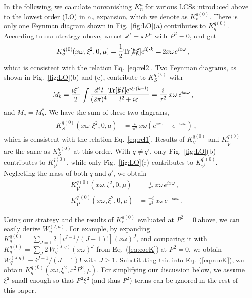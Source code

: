 \documentclass[twocolumn,aps,prl,superscriptaddress,nofootinbib,showpacs]{revtex4-1}
\begin{document}
In the following, we calculate nonvanishing $K_{{n}}^a$ for various LCSs introduced above to the lowest order (LO) in $\alpha_s$ expansion, which we denote as $K_{{n}}^{a(0)}$.
There is only one Feynman diagram shown in Fig.~\ref{fig:LO}(a) contributes to $K^{q(0)}_{q}$. According to our strategy above, we set $k^\mu=x P^\mu$ with $P^2=0$, and get
\begin{align}\label{eq:Kq0}
\begin{split}
K^{q(0)}_{q}(x \omega,\xi^2,0,\mu)&=\frac{1}{2} \text{Tr}[\slashed{k} \slashed{\xi}] e^{i\xi\cdot k}=2 x \omega  e^{i x \omega}\,,
\end{split}
\end{align}
which is consistent with the relation Eq.~\eqref{eq:rel2}. Two Feynman diagrams, as shown in Fig.~\ref{fig:LO}(b) and (c), contribute to $K^{q(0)}_{S}$ with
\begin{align}\label{eq:Mb}
M_b&=\frac{i\xi^4}{2}\int \frac{d^4 l}{(2\pi)^4}\frac{\text{Tr}[\slashed{k} \slashed{l}] e^{i\xi\cdot(k-l)}}{l^2+i\varepsilon}
=\frac{i}{\pi^2}\, x \omega\,  e^{i x \omega}\,,
\end{align}
and $M_c=M_b^*$.  We have the sum of these two diagrams,
\begin{align}\label{eq:Kqq0}
\begin{split}
K^{q(0)}_{S}(x \omega,\xi^2,0,\mu)&= \frac{i}{\pi^2}\, x \omega\left(
e^{i x \omega}-e^{-i x \omega}\right)\,,
\end{split}
\end{align}
which is consistent with the relation Eq.~\eqref{eq:rel1}. Results of $K^{q(0)}_{V}$ and $K^{q(0)}_{\widetilde V}$ are the same as $K^{q(0)}_{S}$ at this order. With $q\neq q'$, only Fig.~\ref{fig:LO}(b) contributes to $K^{q(0)}_{V^\prime}$, while only Fig.~\ref{fig:LO}(c) contributes to $K^{q^\prime(0)}_{V^\prime}$. Neglecting the mass of both $q$ and $q'$, we obtain
\begin{subequations}\label{eq:Vp20}
\begin{align}
K^{q(0)}_{V^\prime}(x \omega,\xi^2,0,\mu)&=\frac{i}{\pi^2}\, x \omega\,e^{i x \omega}\,,\\
K^{q^\prime(0)}_{V^\prime}(x \omega,\xi^2,0,\mu)&=\frac{-i}{\pi^2}\, x \omega\, e^{-i x \omega}\, .
\end{align}
\end{subequations}


Using our strategy and the results of $K_{{n}}^{a(0)}$ evaluated at ${P^2=0}$ above, we can easily derive $W_{n}^{(J,a)}$. For example,  by expanding $K^{q(0)}_{q}=\sum_{J=1} 2\,[i^{J-1}/(J-1)!] (x\omega)^J$, and comparing it with $K^{q(0)}_{q}=\sum_{J} 2\,W_q^{(J,q)}(x\omega)^J$ from Eq.~(\ref{eq:coeK}) at ${P^2=0}$, we obtain $W_{q}^{(J,q)}=i^{J-1}/(J-1)!$ with $J\geq 1$.  Substituting this into Eq.~(\ref{eq:coeK}),  we obtain $K^{q(0)}_{q}(x \omega,\xi^2,x^2P^2,\mu)$. For simplifying our discussion below, we assume $\xi^2$ small enough so that $P^2\xi^2$ (and thus $P^2$) terms can be ignored in the rest of this paper.
\end{document}
